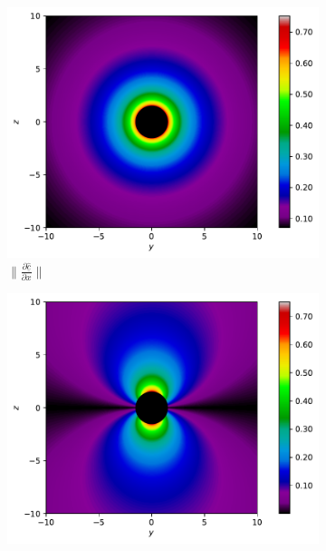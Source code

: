 \begin{figure}[H]
	\centering
	\begin{subfigure}{0.32\textwidth}
		\centering
		\includegraphics[width=\textwidth]{images/pdf/Rate_of_change_of_lights_velocity_field_with_respect_to_x_u_is_0.pdf}
		\caption{$\|\frac{\partial \underline{\hat{c}}}{\partial x}\|$}
		\label{fig: Rate of change of lights velocity field of rest source subfig_1}
	\end{subfigure}
	\begin{subfigure}{0.32\textwidth}
		\centering
		\includegraphics[width=\textwidth]{images/pdf/Rate_of_change_of_lights_velocity_field_with_respect_to_y_u_is_0.pdf}

\end{subfigure}
\end{figure}
